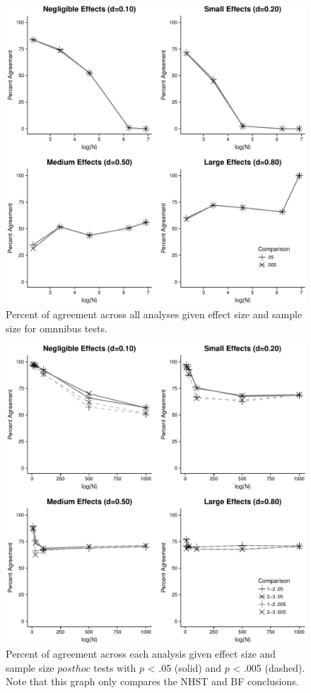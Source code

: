 \documentclass[english,man]{apa6}
\theoremstyle{definition}
\theoremstyle{definition}
\theoremstyle{definition}
\theoremstyle{remark}
\begin{document}
\begin{figure}
\centering
\includegraphics{alt_nhst_FINAL_files/figure-latex/agree-graph-omnibus-1.pdf}
\caption{\label{fig:agree-graph-omnibus}Percent of agreement across all
analyses given effect size and sample size for omnnibus tests.}
\end{figure}

\begin{figure}
\centering
\includegraphics{alt_nhst_FINAL_files/figure-latex/agree-graph-post-1.pdf}
\caption{\label{fig:agree-graph-post}Percent of agreement across each
analysis given effect size and sample size \(post hoc\) tests with \(p\)
\textless{} .05 (solid) and \(p\) \textless{} .005 (dashed). Note that
this graph only compares the NHST and BF conclusions.}
\end{figure}
\end{document}

